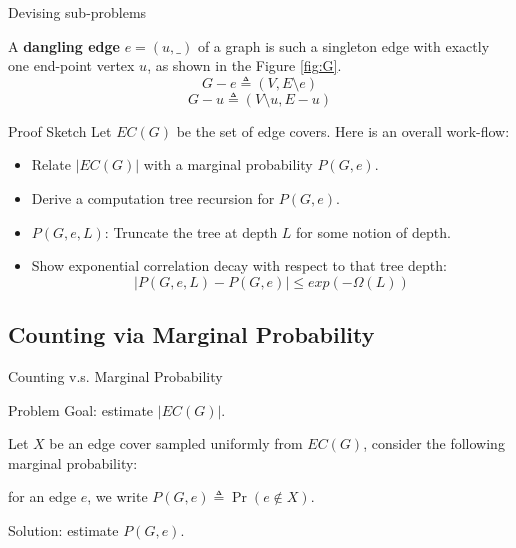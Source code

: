 \documentclass[mathserif]{beamer}
\newcommand{\abs}[1]{\left\vert#1\right\vert}
\begin{document}
\begin{frame}{Devising sub-problems} %

\begin{definition}
	A {\bf dangling edge} $e=(u,\_)$ of a graph is such a singleton edge with exactly one end-point vertex $u$, as shown in the Figure \ref{fig:G}.
\[ G - e \triangleq \left(V, E \setminus e\right) \]
\[ G - u \triangleq \left(V \setminus u, E - u\right) \]
\end{definition}

\end{frame}

\begin{frame}{Proof Sketch}
Let $EC(G)$ be the set of edge covers.
Here is an overall work-flow:
\begin{itemize}
  \item \alert{Relate $\abs{EC(G)}$ with a marginal probability $P(G,e)$.}
  \item Derive a computation tree recursion for $P(G,e)$.
  \item $P(G,e,L)$: Truncate the tree at depth $L$ for some notion of depth.
  \item{ Show exponential correlation decay with respect to that tree depth:
  \[
    \abs{ P(G,e,L) - P(G,e) } \leq exp(-\Omega(L))
  \]}
\end{itemize}

\end{frame}

\subsection{Counting via Marginal Probability}
\begin{frame}{Counting v.s. Marginal Probability}
	\begin{block}{Problem}
	Goal: estimate $\abs{EC(G)}$.
	\end{block}
	
	Let $X$ be an edge cover sampled uniformly from $EC(G)$, consider the following marginal probability:

	for an edge $e$, we write $P(G,e) \triangleq \Pr ( e \notin X)$.

	\bigskip

	Solution: estimate $P(G,e)$.
\end{frame}
\end{document}
